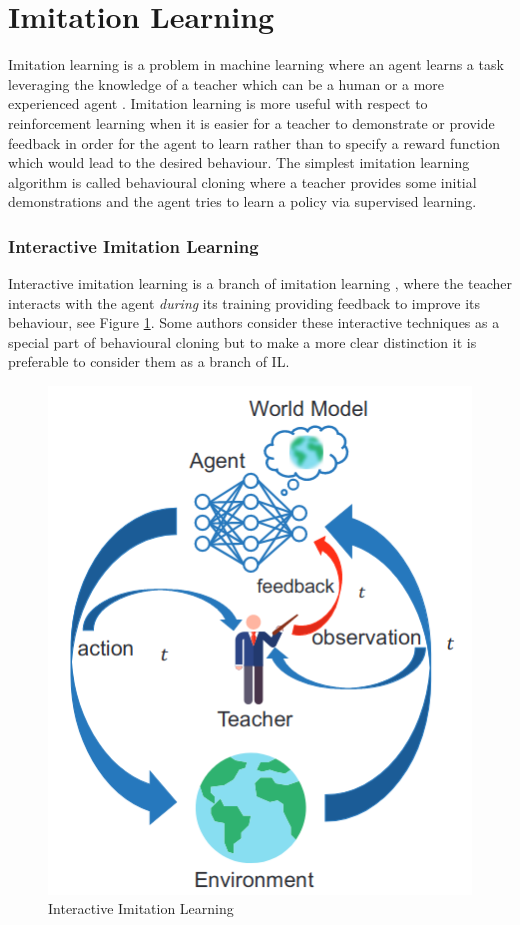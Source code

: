 \section{Imitation Learning}
\label{section:Imitation Learning}

Imitation learning is a problem in machine learning where an agent learns a task leveraging the knowledge of a teacher which can be a human or a more experienced agent \cite{Imitation-Learning-definition-torabi:2019}. Imitation learning is more useful with respect to reinforcement learning when it is easier for a teacher to demonstrate or provide feedback in order for the agent to learn rather than to specify a reward function which would lead to the desired behaviour. The simplest imitation learning algorithm is called behavioural cloning where a teacher provides some initial demonstrations and the agent tries to learn a policy via supervised learning.


\subsubsection{Interactive Imitation Learning}
\label{subsubsection:Interactive-Imitation-Learning}

Interactive imitation learning is a branch of imitation learning \cite{lazydagger:2021}, where the teacher interacts with the agent \textit{during} its training providing feedback to improve its behaviour, see Figure \ref{fig:interactive_imitation_learning}. Some authors \cite{Osa:2018} consider these interactive techniques as a special part of behavioural cloning but to make a more clear distinction it is preferable to consider them as a branch of IL.



\begin{figure}[H]
    \centering
    \includegraphics[width=.4\textwidth]{figures/interactive_imitation_learning.png}
    \caption{Interactive Imitation Learning \cite{D-COACH-Dattari-Celemin-Ruiz-del-Solar-Kober:2018}}
    \label{fig:interactive_imitation_learning}
\end{figure}


